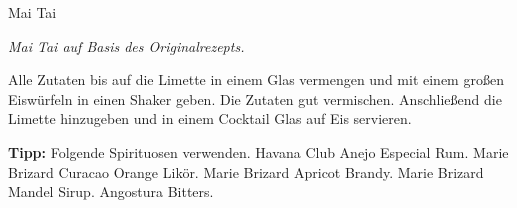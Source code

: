 \begin{recipe}{Mai Tai}{}{}

  \freeform{}\textit{Mai Tai auf Basis des Originalrezepts.}


  Alle Zutaten bis auf die Limette in einem Glas vermengen und mit einem großen Eiswürfeln in einen Shaker geben.
  Die Zutaten gut vermischen.
  Anschließend die Limette hinzugeben und in einem Cocktail Glas auf Eis servieren.

  \freeform{}\hrulefill{}

  \freeform{}\textbf{Tipp:}
  Folgende Spirituosen verwenden.
  Havana Club Anejo Especial Rum.
  Marie Brizard Curacao Orange Likör.
  Marie Brizard Apricot Brandy.
  Marie Brizard Mandel Sirup.
  Angostura Bitters.

\end{recipe}
